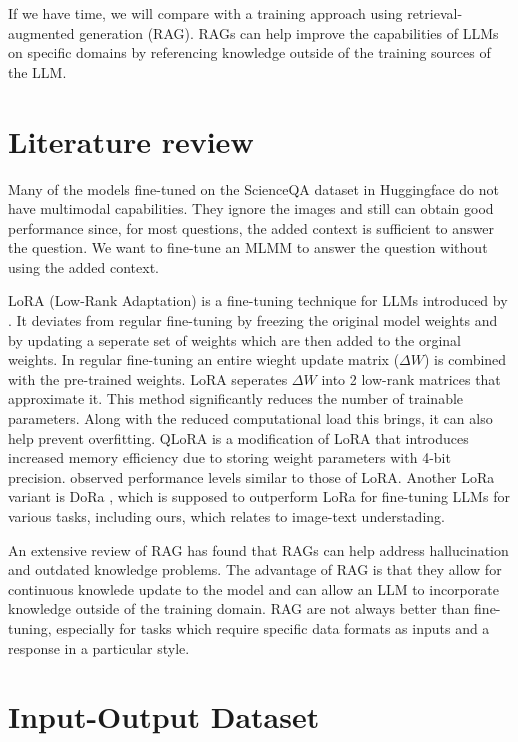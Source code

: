 \documentclass[11pt]{article} %
\begin{document}
If we have time, we will compare with a training approach using retrieval-augmented generation (RAG). RAGs can help improve the capabilities of LLMs on specific domains by referencing knowledge outside of the training sources of the LLM.

\section*{Literature review} 

Many of the models fine-tuned on the ScienceQA dataset in Huggingface do not have multimodal capabilities. They ignore the images and still can obtain good performance since, for most questions, the added context is sufficient to answer the question. We want to fine-tune an MLMM to answer the question without using the added context.

LoRA (Low-Rank Adaptation) is a fine-tuning technique for LLMs introduced by \cite{lora}. It deviates from regular fine-tuning by freezing the original model weights and by updating a seperate set of weights which are then added to the orginal weights. In regular fine-tuning an entire wieght update matrix ($\Delta W$) is combined with the pre-trained weights. LoRA seperates $\Delta W$ into 2 low-rank matrices that approximate it. This method significantly reduces the number of trainable parameters. Along with the reduced computational load this brings, it can also help prevent overfitting. QLoRA \cite{qlora} is a modification of LoRA that introduces increased memory efficiency due to storing weight parameters with 4-bit precision. \cite{qlora} observed performance levels similar to those of LoRA.
Another LoRa variant is DoRa \cite{dora}, which is supposed to outperform LoRa for fine-tuning LLMs for various tasks, including ours, which relates to image-text understading.

An extensive review of RAG \cite{ragreview} has found that RAGs can help address hallucination and outdated knowledge problems. The advantage of RAG is that they allow for continuous knowlede update to the model and can allow an LLM to incorporate knowledge outside of the training domain. RAG are not always better than fine-tuning, especially for tasks which require specific data formats as inputs and a response in a particular style.

\section*{Input-Output Dataset}
\end{document}
